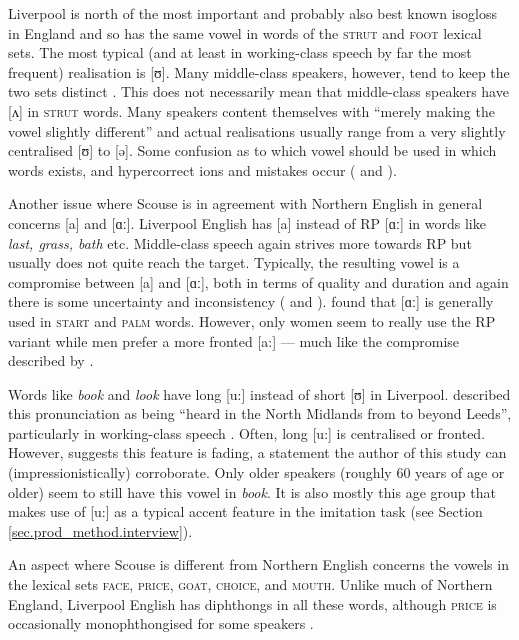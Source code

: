 Liverpool is north of the most important and probably also best known isogloss in England and so has the same vowel in words of the \textsc{strut} and \textsc{foot} lexical sets.
The most typical (and at least in working-class speech by far the most frequent) realisation is [ʊ].
Many middle-class speakers, however, tend to keep the two sets distinct .
This does not necessarily mean that middle-class speakers have [ʌ] in \textsc{strut} words.
Many speakers content themselves with ``merely making the vowel slightly different'' \citep[284]{knowles1973} and actual realisations usually range from a very slightly centralised [ʊ] to [ə].
Some confusion as to which vowel should be used in which words exists, and hypercorrect ions and mistakes occur (\cite[286--287]{knowles1973} and \cite[83]{knowles1978}).

Another issue where Scouse is in agreement with Northern English in general concerns [a] and [ɑː].
Liverpool English has [a] instead of RP [ɑː] in words like \emph{last, grass, bath} etc.
Middle-class speech again strives more towards RP but usually does not quite reach the target.
Typically, the resulting vowel is a compromise between [a] and [ɑː], both in terms of quality and duration and again there is some uncertainty and inconsistency (\citealp[cf.][287--289]{knowles1973} and \citeyear[83--84]{knowles1978}).
\citeauthor{watson2007} found that [ɑː] is generally used in \textsc{start} and \textsc{palm} words.
However, only women seem to really use the RP variant while men prefer a more fronted [a:] \parencite[cf.][358]{watson2007} --- much like the compromise described by \cite{knowles1973}.

Words like \emph{book} and \emph{look} have long [u:] instead of short [ʊ] in Liverpool.
\citet{knowles1973} described this pronunciation as being ``heard in the North Midlands from  to beyond Leeds'', particularly in working-class speech \citep[290]{knowles1973}.
Often, long [u:] is centralised or fronted.
However, \citet[358]{watson2007} suggests this feature is fading, a statement the author of this study can (impressionistically) corroborate.
Only older speakers (roughly 60 years of age or older) seem to still have this vowel in \emph{book}.
It is also mostly this age group that makes use of [u:] as a typical accent feature in the imitation  task (see Section \ref{sec.prod_method.interview}).

An aspect where Scouse is different from Northern English concerns the vowels in the lexical sets \textsc{face}, \textsc{price}, \textsc{goat}, \textsc{choice}, and \textsc{mouth}.
Unlike much of Northern England, Liverpool English has diphthongs in all these words, although \textsc{price} is occasionally monophthongised for some speakers \citep[cf.][358]{watson2007}.

